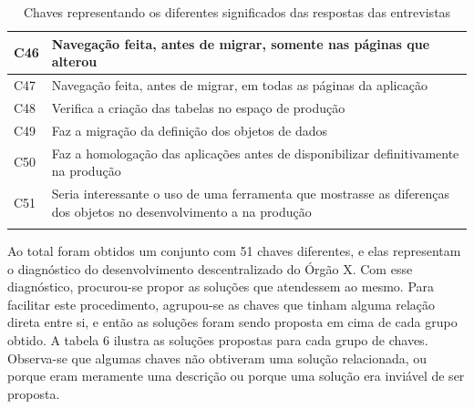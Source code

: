 \begin{longtable}{|M{1.3cm} | m{14.0cm}|}
C46            & Navegação feita, antes de migrar, somente nas páginas que alterou                                                                                                                                                                                                 \\ \hline
C47            & Navegação feita, antes de migrar, em todas as páginas da aplicação                                                                                                                                                                                                \\ \hline
C48            & Verifica a criação das tabelas no espaço de produção                                                                                                                                                                                                              \\ \hline
C49            & Faz a migração da definição dos objetos de dados                                                                                                                                                                                                                  \\ \hline
C50            & Faz a homologação das aplicações antes de disponibilizar definitivamente na produção                                                                                                                                                                              \\ \hline
C51            & Seria interessante o uso de uma ferramenta que mostrasse as diferenças dos objetos no desenvolvimento a na produção                                                                                                                                            \\ \hline
\caption{Chaves representando os diferentes significados das respostas das entrevistas}
\end{longtable}

Ao total foram obtidos um conjunto com 51 chaves diferentes, e elas representam o diagnóstico do desenvolvimento descentralizado do Órgão X. Com esse diagnóstico, procurou-se propor as soluções que atendessem ao mesmo. Para facilitar este procedimento, agrupou-se as chaves que tinham alguma relação direta entre si, e então as soluções foram sendo proposta em cima de cada grupo obtido. A tabela 6 ilustra as soluções propostas para cada grupo de chaves. Observa-se que algumas chaves não obtiveram uma solução relacionada, ou porque eram meramente uma descrição ou porque uma solução era inviável de ser proposta.\newline

